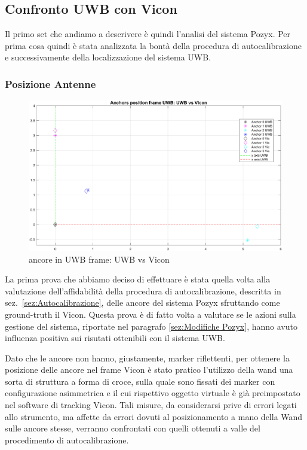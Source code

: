 \subsection{Confronto UWB con Vicon}
Il primo set che andiamo a descrivere \`e quindi l'analisi del sistema Pozyx. 
Per prima cosa quindi \`e stata analizzata la bont\`a della procedura di autocalibrazione e successivamente della localizzazione del sistema UWB.

\subsubsection{Posizione Antenne}

\begin{figure}[]
	\centering
	\includegraphics[height=0.4\textheight]{anchors_UWB_Vicon.png}
	\caption{ancore in UWB frame: UWB vs Vicon}
	\label{fig: ancore in UWB frame, UWB vs Vicon}
\end{figure}

La prima prova che abbiamo deciso di effettuare è stata quella volta alla valutazione dell'affidabilità della procedura di autocalibrazione, descritta in sez.~\ref{sez:Autocalibrazione}, delle ancore del sistema Pozyx sfruttando come ground-truth il Vicon.
Questa prova è di fatto volta a valutare se le azioni sulla gestione del sistema, riportate nel paragrafo \ref{sez:Modifiche Pozyx}, hanno avuto influenza positiva sui risutati ottenibili con il sistema UWB.

Dato che le ancore non hanno, giustamente, marker riflettenti, per ottenere la posizione delle ancore nel frame Vicon \`e stato pratico l'utilizzo della wand una sorta di struttura a forma di croce, sulla quale sono fissati dei marker con configurazione asimmetrica e il cui rispettivo oggetto virtuale è già preimpostato nel software di tracking Vicon.
Tali misure, da considerarsi prive di errori legati allo strumento, ma affette da errori dovuti al posizionamento a mano della Wand sulle ancore stesse, verranno confrontati con quelli ottenuti a valle del procedimento di autocalibrazione.

